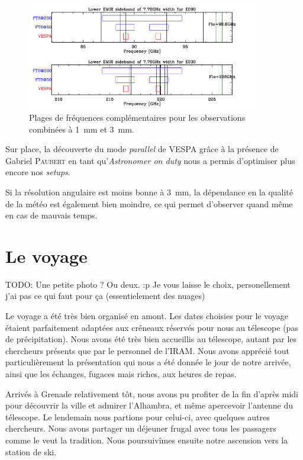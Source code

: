 \documentclass[a4paper,10pt,french]{article}
\newcommand{\troismm}{\SI{3}{\milli\meter}}
\newcommand{\unmm}{\SI{1}{\milli\meter}}
\begin{document}
\begin{figure}[ht]
    \centering
    \includegraphics[width=0.9\textwidth]{specsetup-3mm-1mm-l.pdf}
    \caption{Plages de fréquences complémentaires pour les observations combinées à \unmm{} et \troismm.}
    \label{fig:specsetup_3mm_1mm_l}
\end{figure}

Sur place, la découverte du mode \textit{parallel} de VESPA grâce à la présence
de Gabriel \textsc{Paubert} en tant qu’\textit{Astronomer on duty} nous a
permis d’optimiser plus encore nos \textit{setups}.

Si la résolution angulaire est moins bonne à \troismm, la dépendance en la
qualité de la météo est également bien moindre, ce qui permet d’observer quand
même en cas de mauvais temps.

\section{Le voyage}

TODO: Une petite photo ? Ou deux. :p Je vous laisse le choix, personellement j'ai pas ce qui faut pour ça (essentielement des nuages)

Le voyage a été très bien organisé en amont. Les dates choisies pour le voyage
étaient parfaitement adaptées aux créneaux réservés pour nous au télescope (pas
de précipitation). Nous avons été très bien accueillis au télescope, autant par
les chercheurs présents que par le personnel de l’IRAM. Nous avons apprécié
tout particulièrement la présentation qui nous a été donnée le jour de notre
arrivée, ainsi que les échanges, fugaces mais riches, aux heures de repas.

Arrivés à Grenade relativement tôt, nous avons pu profiter de la fin d'après midi pour découvrir la ville et admirer l'Alhambra, et même apercevoir l'antenne du télescope. Le lendemain nous partions pour celui-ci, avec quelques autres chercheurs. Nous avons partager un déjeuner frugal avec tous les passagers comme le veut la tradition. Nous poursuivîmes ensuite notre ascension vers la station de ski.
\end{document}
